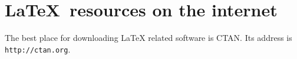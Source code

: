 \documentclass{article}
\begin{document}
	\section{\textsf{\LaTeX\ resources on the internet}}
	The best place for downloading LaTeX related software is CTAN.
	Its address is \texttt{http://ctan.org}.
\end{document}
